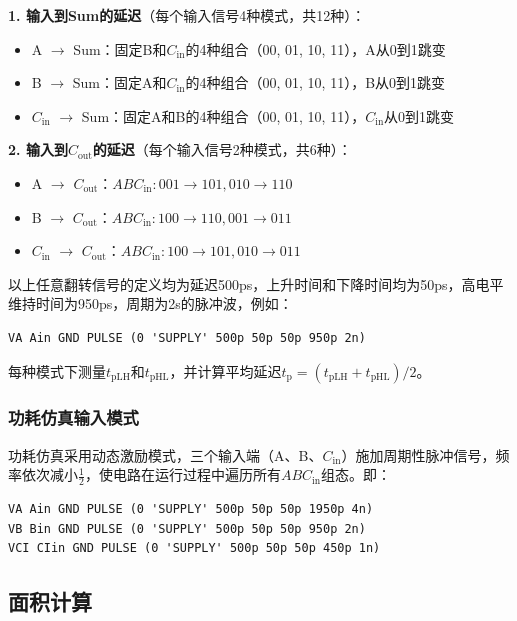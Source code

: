 \documentclass[UTF8,12pt,a4paper]{ctexart}
\begin{document}
\textbf{1. 输入到Sum的延迟}（每个输入信号4种模式，共12种）：
\begin{itemize}
    \item A $\rightarrow$ Sum：固定B和$C_{\text{in}}$的4种组合（00, 01, 10, 11），A从0到1跳变
    \item B $\rightarrow$ Sum：固定A和$C_{\text{in}}$的4种组合（00, 01, 10, 11），B从0到1跳变
    \item $C_{\text{in}}$ $\rightarrow$ Sum：固定A和B的4种组合（00, 01, 10, 11），$C_{\text{in}}$从0到1跳变
\end{itemize}

\textbf{2. 输入到$C_{\text{out}}$的延迟}（每个输入信号2种模式，共6种）：
\begin{itemize}
    \item A $\rightarrow$ $C_{\text{out}}$：$ABC_{\text{in}}: 001\rightarrow 101, 010\rightarrow 110$
    \item B $\rightarrow$ $C_{\text{out}}$：$ABC_{\text{in}}: 100\rightarrow 110, 001\rightarrow 011$
    \item $C_{\text{in}}$ $\rightarrow$ $C_{\text{out}}$：$ABC_{\text{in}}: 100\rightarrow 101, 010\rightarrow 011$
\end{itemize}

以上任意翻转信号的定义均为延迟500ps，上升时间和下降时间均为50ps，高电平维持时间为950ps，周期为2s的脉冲波，例如：
\begin{lstlisting}
VA Ain GND PULSE (0 'SUPPLY' 500p 50p 50p 950p 2n)
\end{lstlisting}
每种模式下测量$t_{\text{pLH}}$和$t_{\text{pHL}}$，并计算平均延迟$t_{\text{p}} = (t_{\text{pLH}} + t_{\text{pHL}})/2$。

\subsubsection{功耗仿真输入模式}

功耗仿真采用动态激励模式，三个输入端（A、B、$C_{\text{in}}$）施加周期性脉冲信号，频率依次减小$\frac{1}{2}$，使电路在运行过程中遍历所有$ABC_{\text{in}}$组态。即：
\begin{lstlisting}
VA Ain GND PULSE (0 'SUPPLY' 500p 50p 50p 1950p 4n)
VB Bin GND PULSE (0 'SUPPLY' 500p 50p 50p 950p 2n)
VCI CIin GND PULSE (0 'SUPPLY' 500p 50p 50p 450p 1n)
\end{lstlisting}

\subsection{面积计算}
\end{document}
